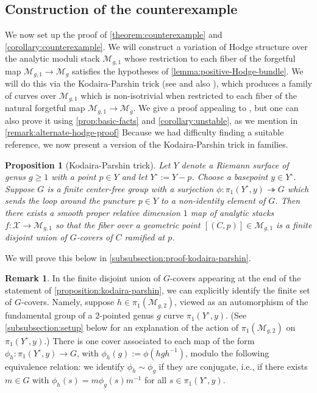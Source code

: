 \documentclass[12 pt]{amsart}
\theoremstyle{plain}
\newtheorem{proposition}[subsubsection]{Proposition}
\theoremstyle{definition}
\newtheorem{remark}[subsubsection]{Remark}
\theoremstyle{remark}
\numberwithin{equation}{section}
\begin{document}
\subsection{Construction of the counterexample}
We now set up the proof of \autoref{theorem:counterexample} and
\autoref{corollary:counterexample}. We will construct a variation of Hodge
structure over the analytic moduli stack $\mathscr{M}_{g,1}$ whose restriction to each fiber of the forgetful map $\mathscr{M}_{g,1}\to \mathscr{M}_g$ satisfies the hypotheses of \autoref{lemma:positive-Hodge-bundle}. We will do this via the Kodaira-Parshin trick
(see
\cite[Proposition 7]{parshin:algebraic-curves-over-function-fields-i}
and also
\cite[Proposition 7.1]{lawrenceV:diophantine-problems}), 
which produces a family of curves over $\mathscr{M}_{g,1}$ which is non-isotrivial when restricted to each fiber of the natural forgetful map $\mathscr{M}_{g,1}\to \mathscr{M}_g$. 
We give a proof appealing to \cite{cataneseD:answer-to-a-question-by-fujita},
but one can also prove it using \autoref{prop:basic-facts}  and
\autoref{corollary:unstable}, as we mention in
\autoref{remark:alternate-hodge-proof}
Because we had difficulty finding a suitable reference, we now present a version
of the Kodaira-Parshin trick in families.

\begin{proposition}[Kodaira-Parshin trick]
	\label{proposition:kodaira-parshin}
	Let $Y$ denote a Riemann surface of genus $g\geq 1$ with a point $p \in Y$ and
	let $Y^{\circ} := Y - p$. Choose a basepoint $y \in Y^{\circ}$.
	Suppose $G$ is a finite center-free group with a surjection
	$\phi: \pi_1(Y^{\circ},y) \twoheadrightarrow G$ which sends the loop around the puncture $p \in Y$ to 
	a non-identity element of $G$.
	Then there exists a smooth proper relative dimension $1$ map of
	analytic stacks $f: \mathscr{X} \to
	\mathscr{M}_{g,1}$ so that the fiber over a geometric point $[(C,p)] \in
	\mathscr{M}_{g,1}$ is a finite disjoint union of $G$-covers of $C$
	ramified at $p$.
\end{proposition}
We will prove this below in \autoref{subsubsection:proof-kodaira-parshin}.
\begin{remark}
	\label{remark:}
	In the finite disjoint union of $G$-covers appearing at the end of the
	statement of \autoref{proposition:kodaira-parshin},
	we can explicitly identify the finite set of $G$-covers.
	Namely, suppose $h \in \pi_1(\mathscr M_{g,2})$, viewed as an
	automorphism of the fundamental group of a $2$-pointed genus $g$ curve $\pi_1(Y^{\circ},y)$. (See \autoref{subsubsection:setup} below for an explanation of the action of $\pi_1(\mathscr{M}_{g,2})$ on $\pi_1(Y^\circ, y)$.)
	There is one cover associated to each map
	of the form $\phi_h: \pi_1(Y^{\circ},y) \to G$, with $\phi_h(g) :=
	\phi(hgh^{-1})$,
	modulo the following equivalence relation:
	we identify $\phi_h \sim \phi_{g}$ if they
	are conjugate, i.e., if there exists $m \in G$ with $\phi_h(s) = m
	\phi_g(s)m^{-1}$ for all $s \in \pi_1(Y^{\circ},y)$.
\end{remark}
\end{document}
